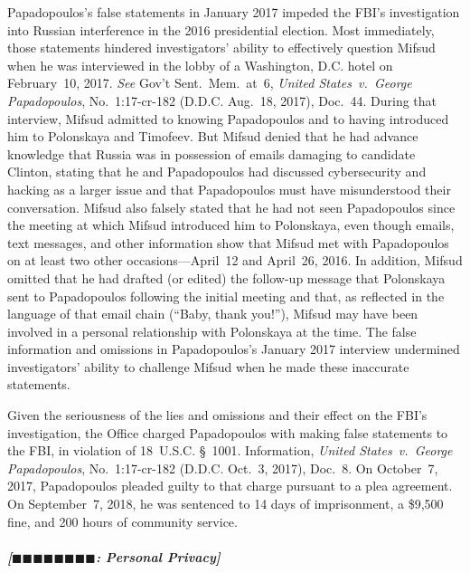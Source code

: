 Papadopoulos's false statements in January 2017 impeded the FBI's investigation into Russian interference in the 2016 presidential election.
Most immediately, those statements hindered investigators' ability to effectively question Mifsud when he was interviewed in the lobby of a Washington, D.C. hotel on February~10, 2017.
\textit{See} Gov't Sent.~Mem.\ at~6, \textit{United States~v.\ George Papadopoulos}, No.~1:17-cr-182 (D.D.C. Aug.~18, 2017), Doc.~44.
During that interview, Mifsud admitted to knowing Papadopoulos and to having introduced him to Polonskaya and Timofeev.
But Mifsud denied that he had advance knowledge that Russia was in possession of emails damaging to candidate Clinton, stating that he and Papadopoulos had discussed cybersecurity and hacking as a larger issue and that Papadopoulos must have misunderstood their conversation.
Mifsud also falsely stated that he had not seen Papadopoulos since the meeting at which Mifsud introduced him to Polonskaya, even though emails, text messages, and other information show that Mifsud met with Papadopoulos on at least two other occasions---April~12 and April~26, 2016.
In addition, Mifsud omitted that he had drafted (or edited) the follow-up message that Polonskaya sent to Papadopoulos following the initial meeting and that, as reflected in the language of that email chain (``Baby, thank you!''), Mifsud may have been involved in a personal relationship with Polonskaya at the time.
The false information and omissions in Papadopoulos's January 2017 interview undermined investigators' ability to challenge Mifsud when he made these inaccurate statements.

Given the seriousness of the lies and omissions and their effect on the FBI's investigation, the Office charged Papadopoulos with making false statements to the FBI, in violation of 18~U.S.C. \S~1001.
Information, \textit{United States~v.\ George Papadopoulos}, No.~1:17-cr-182 (D.D.C. Oct.~3, 2017), Doc.~8.
On October~7, 2017, Papadopoulos pleaded guilty to that charge pursuant to a plea agreement.
On September~7, 2018, he was sentenced to 14 days of imprisonment, a \$9,500 fine, and 200 hours of community service.

\subparagraph{[$\blacksquare\blacksquare\blacksquare\blacksquare\blacksquare\blacksquare\blacksquare\blacksquare$: Personal Privacy]}


